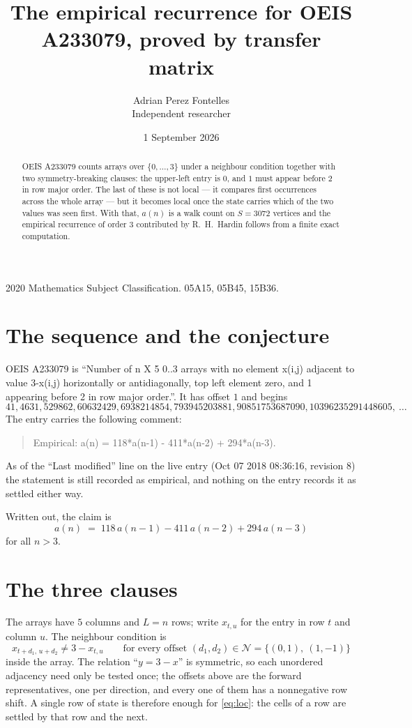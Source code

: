 \documentclass[11pt,a4paper]{article}
\title{The empirical recurrence for OEIS A233079, proved by transfer matrix}
\author{Adrian Perez Fontelles\\ \small Independent researcher}
\date{1 September 2026}
\theoremstyle{plain}
\theoremstyle{definition}
\begin{document}
\maketitle

\begin{abstract}
OEIS A233079 counts arrays over $\{0,\dots,3\}$ under a neighbour condition together with
two symmetry-breaking clauses: the upper-left entry is $0$, and $1$ must appear before
$2$ in row major order. The last of these is not local --- it compares first occurrences
across the whole array --- but it becomes local once the state carries which of the two values
was seen first. With that, $a(n)$ is a walk count on $S=3072$ vertices and the empirical
recurrence of order $3$ contributed by R.~H.~Hardin follows from a finite exact
computation.
\end{abstract}

\noindent\small 2020 Mathematics Subject Classification. 05A15, 05B45, 15B36.\normalsize

\section{The sequence and the conjecture}

OEIS A233079 is ``Number of n X 5 0..3 arrays with no element x(i,j) adjacent to value 3-x(i,j) horizontally or antidiagonally, top left element zero, and 1 appearing before 2 in row major order.''. It has offset $1$ and begins
\[
41, 4631, 529862, 60632429, 6938214854, 793945203881, 90851753687090, 10396235291448605,\ \dots
\]
The entry carries the following comment:
\begin{quote}\small
Empirical: a(n) = 118*a(n-1) - 411*a(n-2) + 294*a(n-3).
\end{quote}
As of the ``Last modified'' line on the live entry (Oct 07 2018 08:36:16, revision 8) the statement is
still recorded as empirical, and nothing on the entry records it as settled either way.

Written out, the claim is
\begin{equation}\label{eq:conj}
a(n)\;=\;118\,a(n-1) - 411\,a(n-2) + 294\,a(n-3)
\end{equation}
for all $n>3$.

\section{The three clauses}

The arrays have $5$ columns and $L=n$ rows; write $x_{t,u}$ for the entry in
row $t$ and column $u$. The neighbour condition is
\begin{equation}\label{eq:loc}
x_{t+d_1,\,u+d_2}\ne 3-x_{t,u}\qquad\text{for every offset }(d_1,d_2)\in\mathcal N=\{(0,1),\ (1,-1)\}
\end{equation}
inside the array. The relation ``$y=3-x$'' is symmetric, so each unordered adjacency need
only be tested once; the offsets above are the forward representatives, one per direction,
and every one of them has a nonnegative row shift. A single row of state is therefore
enough for \eqref{eq:loc}: the cells of a row are settled by that row and the next.
\end{document}
